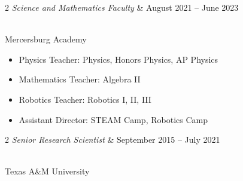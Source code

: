 \documentclass{res}
\begin{document}
{\begin{resume}
\begin{ncolumn}{2}
{\it Science and Mathematics Faculty}  &   August 2021 -- June 2023
\end{ncolumn}\\
Mercersburg Academy
\begin{itemize} \itemsep1pt \parskip0pt 
\item Physics Teacher: Physics, Honors Physics, AP Physics
\item Mathematics Teacher: Algebra II
\item Robotics Teacher: Robotics I, II, III
\item Assistant Director: STEAM Camp, Robotics Camp
\end{itemize}
\begin{ncolumn}{2}
{\it Senior Research Scientist}  &   September 2015 -- July 2021
\end{ncolumn}\\
Texas A\&M University
\begin{itemize} \itemsep1pt \parskip0pt 

\end{itemize}
\end{resume}}
\end{document}
